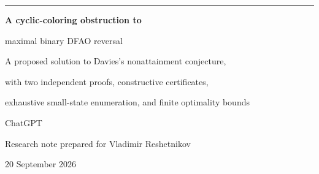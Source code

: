 \documentclass[11pt,a4paper]{article}
\numberwithin{equation}{section}
\theoremstyle{definition}
\theoremstyle{remark}
\begin{document}
\hypersetup{pageanchor=false}
\begin{titlepage}
\vspace*{-8mm}
{\color{Olive}\rule{\textwidth}{1.2pt}}\par
\vspace{4mm}
{\LARGE\bfseries A cyclic-coloring obstruction to\par
maximal binary DFAO reversal\par}
\vspace{4mm}
{\large A proposed solution to Davies's nonattainment conjecture,\par
with two independent proofs, constructive certificates,\par
exhaustive small-state enumeration, and finite optimality bounds\par}
\vspace{2mm}
{\large ChatGPT}\par
{Research note prepared for Vladimir Reshetnikov}\par
{20 September 2026}
\vspace{2mm}
\begin{abstract}
An $n$-state deterministic finite automaton with $k$ output values admits a
reversal construction with $k^n$ states. We investigate whether this bound can
be attained with only two input letters when $3\le k\le n$. We give a
self-contained proposed proof that it cannot. More precisely, for arbitrary
transformations $a,b$ of an $n$-element set and arbitrary $k$-valued output map
$\tau$, we prove
\[
 |\tau\langle a,b\rangle|\le k^n-k!+g(k)<k^n,
\]
where $g(k)$ is the maximum order of a permutation of $k$ objects.
The central construction is the graph formed by translating one collision
pair under a permutation. This graph is always $3$-colorable. Its proper
colorings can only be reached through permutation powers, whereas three
suitable output relabelings cannot lie in a single cyclic orbit.

Two independent proofs of nonattainment are given: a short qualitative one,
which uses no counting and no Landau function, and the quantitative one that
yields the displayed additive deficit. We also give a polynomial-time
algorithm producing an explicit missing coloring together with two
independently checkable certificate formats, extend the obstruction to an
abelian group of permutation letters and one singular letter, and derive two
sharper upper bounds from chromatic polynomials: an instance-specific one
that is exact for the worked examples, and a weaker one that abstracts into a
universal structural bound. A complete C++ enumeration settles all
$462\,066$ reduced instances with $n\le4$, and exact arithmetic verifies
agreement with Davies's proposed binary optimum for all $372$ pairs
$7\le n\le30$, $3\le k<n$. This finite optimality statement is distinct from
the unrestricted theorem. Source, verification programs, explicit automata,
certificates, and numerical records accompany the article.
\end{abstract}
\small


\end{titlepage}
\end{document}
